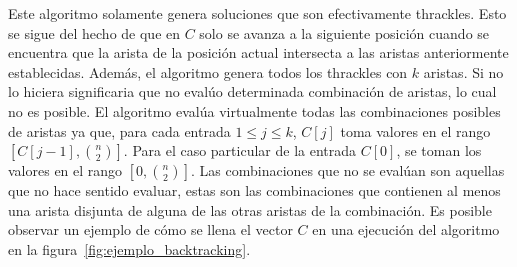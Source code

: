   Este algoritmo solamente genera soluciones que son efectivamente thrackles.
  Esto se sigue del hecho de que en $C$ solo se avanza a la siguiente posición
  cuando se encuentra que la arista de la posición actual intersecta a las
  aristas anteriormente establecidas. Además, el algoritmo genera todos los
  thrackles con $k$ aristas. Si no lo hiciera significaria que no evalúo
  determinada combinación de aristas, lo cual no es posible. El algoritmo
  evalúa virtualmente todas las combinaciones posibles de aristas ya que, para
  cada entrada $1\leq j\leq k$, $C[j]$ toma valores en el rango
  $\left[C[j-1],\binom{n}{2}\right]$. Para el caso particular de la entrada
  $C[0]$, se toman los valores en el rango $\left[ 0, \binom{n}{2}\right]$. Las
  combinaciones que no se evalúan son aquellas que no hace sentido evaluar,
  estas son las combinaciones que contienen al menos una arista disjunta de
  alguna de las otras aristas de la combinación. Es posible observar un ejemplo de cómo se llena el vector $C$ en una ejecución del algoritmo en la figura~\ref{fig:ejemplo_backtracking}.


